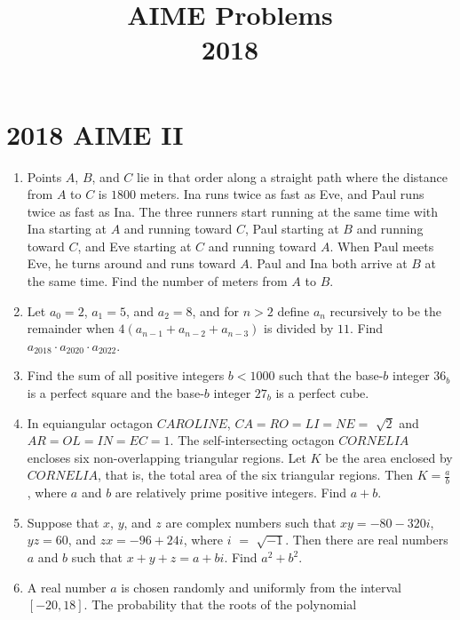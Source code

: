 \documentclass{article}
\title{AIME Problems \\ 2018}
\date{}
\begin{document}
\maketitle\thispagestyle{fancy}\newpage\section*{2018 AIME II}
\begin{enumerate}[label=\arabic*., itemsep=0.5em]
\item Points \(A\), \(B\), and \(C\) lie in that order along a straight path where the distance from \(A\) to \(C\) is \(1800\) meters. Ina runs twice as fast as Eve, and Paul runs twice as fast as Ina. The three runners start running at the same time with Ina starting at \(A\) and running toward \(C\), Paul starting at \(B\) and running toward \(C\), and Eve starting at \(C\) and running toward \(A\). When Paul meets Eve, he turns around and runs toward \(A\). Paul and Ina both arrive at \(B\) at the same time. Find the number of meters from \(A\) to \(B\).\par \vspace{0.5em}\item Let \(a_{0} = 2\), \(a_{1} = 5\), and \(a_{2} = 8\), and for \(n > 2\) define \(a_{n}\) recursively to be the remainder when \(4(a_{n-1} + a_{n-2} + a_{n-3})\) is divided by \(11\). Find \(a_{2018} \cdot a_{2020} \cdot a_{2022}\).\par \vspace{0.5em}\item Find the sum of all positive integers \(b < 1000\) such that the base-\(b\) integer \(36_{b}\) is a perfect square and the base-\(b\) integer \(27_{b}\) is a perfect cube.\par \vspace{0.5em}\item In equiangular octagon \(CAROLINE\), \(CA = RO = LI = NE =\) \(\sqrt{2}\) and \(AR = OL = IN = EC = 1\). The self-intersecting octagon \(CORNELIA\) encloses six non-overlapping triangular regions. Let \(K\) be the area enclosed by \(CORNELIA\), that is, the total area of the six triangular regions. Then \(K = \frac{a}{b}\), where \(a\) and \(b\) are relatively prime positive integers. Find \(a + b\).\par \vspace{0.5em}\item Suppose that \(x\), \(y\), and \(z\) are complex numbers such that \(xy = -80 - 320i\), \(yz = 60\), and \(zx = -96 + 24i\), where \(i\) \(=\) \(\sqrt{-1}\). Then there are real numbers \(a\) and \(b\) such that \(x + y + z = a + bi\). Find \(a^2 + b^2\).\par \vspace{0.5em}\item A real number \(a\) is chosen randomly and uniformly from the interval \([-20, 18]\). The probability that the roots of the polynomial



\end{enumerate}
\end{document}
